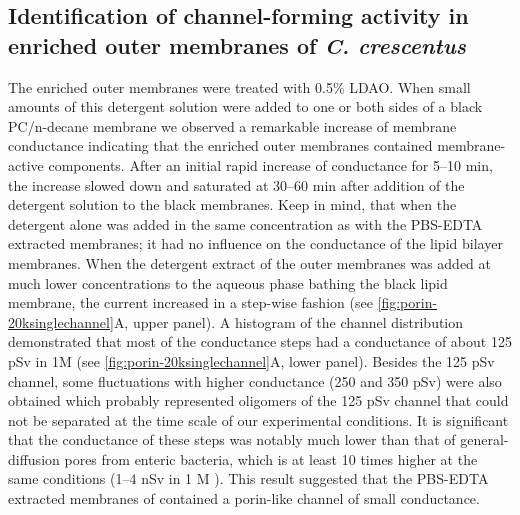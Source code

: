 \subsection{Identification of channel-forming activity in enriched outer membranes of \textit{C. crescentus}}
The enriched outer membranes were treated with 0.5\% \ac{LDAO}. When small amounts of this detergent solution were added to one or both sides of a black \ac{PC}/n-decane membrane we observed a remarkable increase of membrane conductance indicating that the enriched outer membranes contained membrane-active components. %
After an initial rapid increase of conductance for 5--10 min, the increase slowed down and saturated at 30--60 min after addition of the detergent solution to the black membranes. Keep in mind, that when the detergent alone was added in the same concentration as with the \ac{PBS}-\ac{EDTA} extracted membranes; it had no influence on the conductance of the lipid bilayer membranes. When the detergent extract of the outer membranes was added at much lower concentrations to the aqueous phase bathing the black lipid membrane, the current increased in a step-wise fashion (see \cref{fig:porin-20ksinglechannel}A, upper panel). A histogram of the channel distribution demonstrated that most of the conductance steps had a conductance of about 125 \si{\pico\sievert} in 1M  (see \cref{fig:porin-20ksinglechannel}A, lower panel). Besides the 125 \si{\pico\sievert} channel, some fluctuations with higher conductance (250 and 350 \si{\pico\sievert}) were also obtained which probably represented oligomers of the 125 \si{\pico\sievert} channel that could not be separated at the time scale of our experimental conditions. It is significant that the conductance of these steps was notably much lower than that of general-diffusion pores from enteric bacteria, which is at least 10 times higher at the same conditions (1--4 \si{\nano\sievert} in 1 M ). This result suggested that the \ac{PBS}-\ac{EDTA} extracted membranes of \caulobacter contained a porin-like channel of small conductance. 

